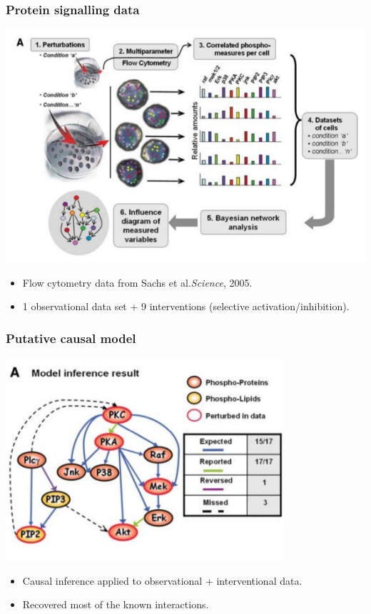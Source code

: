 \documentclass{beamer}
\begin{document}
\begin{frame}
\frametitle{Protein signalling data}
\begin{center}
\includegraphics[scale=0.3]{../images/cytoA.png}
\end{center}
\begin{itemize}
\item Flow cytometry data from Sachs et al.\emph{Science}, 2005.
\item 1 observational data set + 9 interventions (selective activation/inhibition).
\end{itemize}
\end{frame}

\begin{frame}
\frametitle{Putative causal model}
\begin{center}
\includegraphics[scale=0.5]{../images/cyto_result_cropped.png}
\end{center}
\begin{itemize}
\item Causal inference applied to observational + interventional data.
\item Recovered most of the known interactions.
\end{itemize}
\end{frame}
\end{document}
